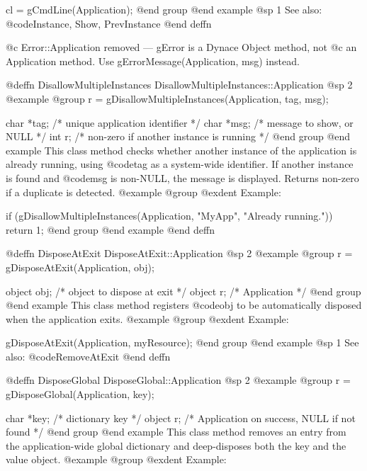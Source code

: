 cl = gCmdLine(Application);
@end group
@end example
@sp 1
See also:  @code{Instance, Show, PrevInstance}
@end deffn















@c Error::Application removed — gError is a Dynace Object method, not
@c an Application method.  Use gErrorMessage(Application, msg) instead.



@deffn {DisallowMultipleInstances} DisallowMultipleInstances::Application
@sp 2
@example
@group
r = gDisallowMultipleInstances(Application, tag, msg);

char    *tag;   /*  unique application identifier  */
char    *msg;   /*  message to show, or NULL       */
int     r;      /*  non-zero if another instance is running  */
@end group
@end example
This class method checks whether another instance of the application
is already running, using @code{tag} as a system-wide identifier.
If another instance is found and @code{msg} is non-NULL, the message
is displayed.  Returns non-zero if a duplicate is detected.
@example
@group
@exdent Example:

if (gDisallowMultipleInstances(Application, "MyApp", "Already running."))
    return 1;
@end group
@end example
@end deffn



@deffn {DisposeAtExit} DisposeAtExit::Application
@sp 2
@example
@group
r = gDisposeAtExit(Application, obj);

object  obj;    /*  object to dispose at exit  */
object  r;      /*  Application                */
@end group
@end example
This class method registers @code{obj} to be automatically disposed
when the application exits.
@example
@group
@exdent Example:

gDisposeAtExit(Application, myResource);
@end group
@end example
@sp 1
See also:  @code{RemoveAtExit}
@end deffn



@deffn {DisposeGlobal} DisposeGlobal::Application
@sp 2
@example
@group
r = gDisposeGlobal(Application, key);

char    *key;   /*  dictionary key  */
object  r;      /*  Application on success, NULL if not found  */
@end group
@end example
This class method removes an entry from the application-wide global
dictionary and deep-disposes both the key and the value object.
@example
@group
@exdent Example:

